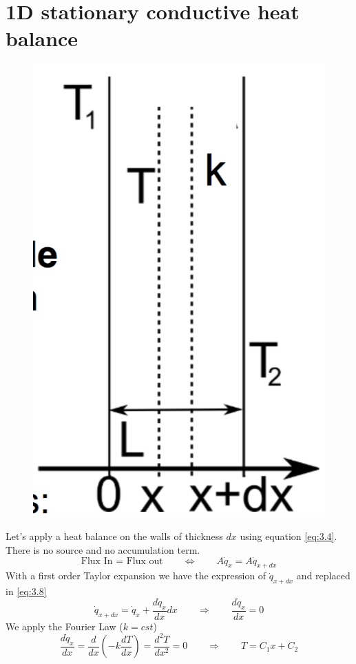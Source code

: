 	 	\section{1D stationary conductive heat balance}
	 		\begin{figure}
 			\vspace{-5mm}
 			\includegraphics[scale=0.2]{ch3/5}
 			\end{figure}
 			Let's apply a heat balance on the walls of thickness $dx$ using equation \autoref{eq:3.4}. There is no source and no accumulation term. 
 			\begin{equation}
 				\mbox{Flux In = Flux out} \qquad \Leftrightarrow \qquad A\dot{q}_x = A\dot{q}_{x+dx}
 				\label{eq:3.8}
 			\end{equation}
 			With a first order Taylor expansion we have the expression of $\dot{q}_{x+dx}$ and replaced in \autoref{eq:3.8}
 			\begin{equation}
 				\dot{q}_{x+dx} = \dot{q}_x + \frac{d\dot{q}_x}{dx}dx \qquad \Rightarrow \qquad \frac{d\dot{q}_x}{dx} = 0
 			\end{equation}
 			We apply the Fourier Law ($k =cst$)
 			\begin{equation}
 				\frac{d\dot{q}_x}{dx} = \frac{d}{dx}\left(- k\frac{dT}{dx} \right) = \frac{d^2T}{dx^2} = 0 \qquad \Rightarrow \qquad T = C_1 x + C_2
 			\end{equation}
